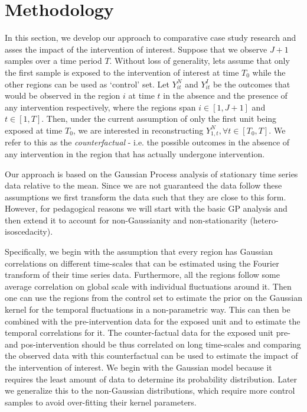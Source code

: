 \documentclass{article}
\newcommand\US[1]{\textcolor{red}{(US: #1)}}
\begin{document}
\section{Methodology}
\label{sec:methodology}


In this section, we develop our approach to comparative case study research and asses the impact of the intervention of interest.
Suppose that we observe $J + 1$ samples over a time period $T$. Without loss of generality, lets assume that only the first sample is exposed to the intervention of interest at time $T_0$ while the other regions can be used as `control' set.
Let $Y^N_{it}$ and $Y^I_{it}$ be the outcomes that would be observed in the region $i$ at time $t$ in the absence and the presence of any intervention respectively, where the regions span $i\in[1,J+1]$ and $t\in[1, T]$. Then, under the current assumption of only the first unit being exposed at time $T_0$, we are interested in reconstructing $Y^N_{1, t},  \forall t\in[T_0, T]$. We refer to this as the {\it counterfactual} - i.e. the possible outcomes in the absence of any intervention in the region that has actually undergone intervention. 

Our approach is based on the Gaussian Process analysis of stationary 
time series data relative 
to the mean. Since we are not guaranteed the data follow these
assumptions we first  transform 
the data such that they are close to this form. However, 
for pedagogical reasons 
we will start with the basic GP analysis and then extend it 
to account for non-Gaussianity and non-stationarity (hetero-isoscedacity). 

Specifically, we begin with the assumption that every region has Gaussian correlations on different time-scales that can be estimated using the Fourier transform of their time series data. Furthermore, all the regions follow some average correlation on global scale with individual fluctuations around it. Then one can use the regions from the control set to estimate the prior on the Gaussian kernel for the temporal fluctuations in a non-parametric way. This can then be combined with the pre-intervention data for the exposed unit and to estimate the temporal correlations for it. The counter-factual data for the exposed unit pre- and pos-intervention should be thus correlated on long time-scales and comparing the observed data with this counterfactual can be used to estimate the impact of the intervention of interest. We begin with the Gaussian model because it requires 
the least amount of data to determine its probability distribution. Later we generalize this 
to the non-Gaussian distributions, which require more control samples to avoid 
over-fitting their kernel parameters. 
\end{document}
